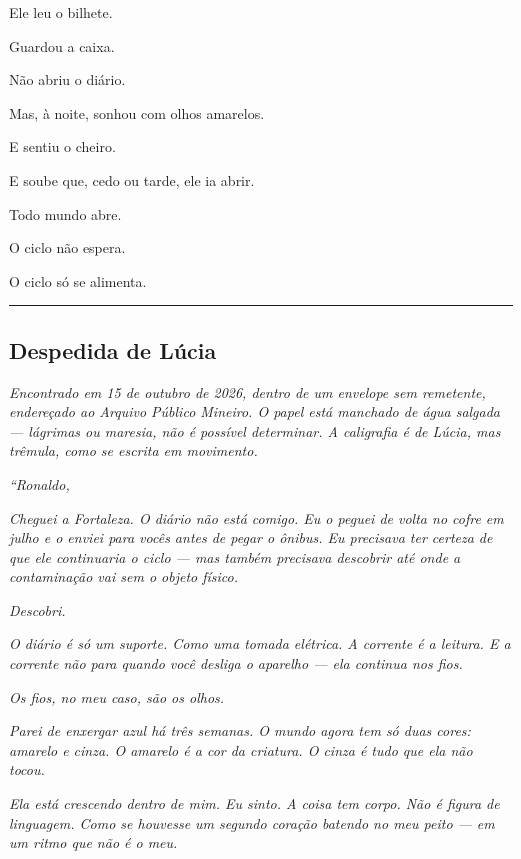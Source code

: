 \noindent Ele leu o bilhete.

\noindent Guardou a caixa.

\noindent Não abriu o diário.

\noindent Mas, à noite, sonhou com olhos amarelos.

\noindent E sentiu o cheiro.

\noindent E soube que, cedo ou tarde, ele ia abrir.

\noindent Todo mundo abre.

\noindent O ciclo não espera.

\noindent O ciclo só se alimenta.

\vspace{0.5em}\noindent\rule{\textwidth}{0.5pt}\vspace{0.5em}

\subsection*{Despedida de Lúcia}

\noindent \textit{Encontrado em 15 de outubro de 2026, dentro de um envelope sem remetente, endereçado ao Arquivo Público Mineiro. O papel está manchado de água salgada --- lágrimas ou maresia, não é possível determinar. A caligrafia é de Lúcia, mas trêmula, como se escrita em movimento.}

\noindent \textit{\textquotedblleft{}Ronaldo,}

\noindent \textit{Cheguei a Fortaleza. O diário não está comigo. Eu o peguei de volta no cofre em julho e o enviei para vocês antes de pegar o ônibus. Eu precisava ter certeza de que ele continuaria o ciclo --- mas também precisava descobrir até onde a contaminação vai sem o objeto físico.}

\noindent \textit{Descobri.}

\noindent \textit{O diário é só um suporte. Como uma tomada elétrica. A corrente é a leitura. E a corrente não para quando você desliga o aparelho --- ela continua nos fios.}

\noindent \textit{Os fios, no meu caso, são os olhos.}

\noindent \textit{Parei de enxergar azul há três semanas. O mundo agora tem só duas cores: amarelo e cinza. O amarelo é a cor da criatura. O cinza é tudo que ela não tocou.}

\noindent \textit{Ela está crescendo dentro de mim. Eu sinto. A coisa tem corpo. Não é figura de linguagem. Como se houvesse um segundo coração batendo no meu peito --- em um ritmo que não é o meu.}

